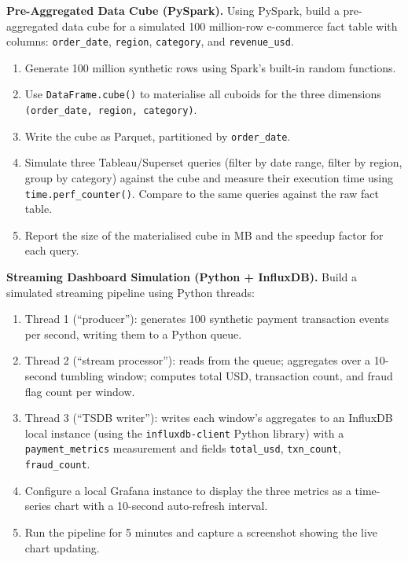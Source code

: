 \pe \textbf{Pre-Aggregated Data Cube (PySpark).}
Using PySpark, build a pre-aggregated data cube for a simulated 100
million-row e-commerce fact table with columns: \texttt{order\_date},
\texttt{region}, \texttt{category}, and \texttt{revenue\_usd}.
\begin{enumerate}[label=(\alph*)]
  \item Generate 100 million synthetic rows using Spark's built-in
        random functions.
  \item Use \texttt{DataFrame.cube()} to materialise all cuboids for the
        three dimensions \texttt{(order\_date, region, category)}.
  \item Write the cube as Parquet, partitioned by \texttt{order\_date}.
  \item Simulate three Tableau/Superset queries (filter by date range,
        filter by region, group by category) against the cube and
        measure their execution time using \texttt{time.perf\_counter()}.
        Compare to the same queries against the raw fact table.
  \item Report the size of the materialised cube in MB and the speedup
        factor for each query.
\end{enumerate}

\pe \textbf{Streaming Dashboard Simulation (Python + InfluxDB).}
Build a simulated streaming pipeline using Python threads:
\begin{enumerate}[label=(\alph*)]
  \item Thread 1 (``producer''): generates 100 synthetic payment
        transaction events per second, writing them to a Python queue.
  \item Thread 2 (``stream processor''): reads from the queue; aggregates
        over a 10-second tumbling window; computes total USD, transaction
        count, and fraud flag count per window.
  \item Thread 3 (``TSDB writer''): writes each window's aggregates
        to an InfluxDB local instance (using the \texttt{influxdb-client}
        Python library) with a \texttt{payment\_metrics} measurement and
        fields \texttt{total\_usd}, \texttt{txn\_count},
        \texttt{fraud\_count}.
  \item Configure a local Grafana instance to display the three metrics
        as a time-series chart with a 10-second auto-refresh interval.
  \item Run the pipeline for 5 minutes and capture a screenshot
        showing the live chart updating.
\end{enumerate}


